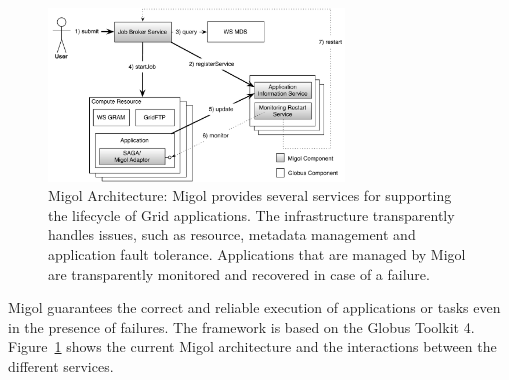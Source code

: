 \documentclass[times, 10pt, twocolumn]{article}
\begin{document}

\label{sec:migol}

\begin{figure}[t]
            \centering
                \includegraphics[width=0.7\textwidth]{migol_architecture}
            \caption{Migol Architecture: Migol provides several services for supporting the lifecycle of Grid applications. The infrastructure transparently handles issues, such as resource, metadata management and application fault tolerance.  Applications that are managed by Migol are transparently monitored and recovered in case of a failure.}
            \label{fig:migol_architecture} 
\end{figure}           


Migol guarantees the correct and reliable exe\-cution of applications or tasks even in
the presence of  failures. The framework is based on the Globus Toolkit 4. 
Figure~\ref{fig:migol_architecture} shows the current Migol architecture and 
the interactions between the different services.
\end{document}
